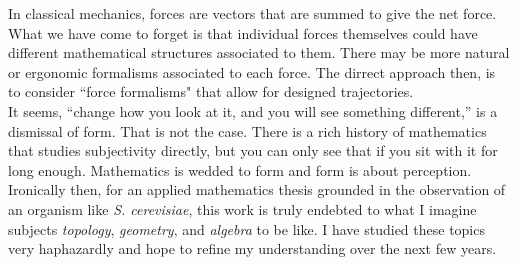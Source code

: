 In classical mechanics, forces are vectors that 
are summed to give the net force. What we have 
come to forget is that individual forces themselves
could have different mathematical structures associated 
to them. There may be more natural or ergonomic 
formalisms associated to each force. 
The dirrect approach then, is to consider 
``force formalisms" that allow for designed trajectories.
\\

It seems, ``change how you look at it, and you will see something 
different,'' is a dismissal of form. That is not the case. 
There is a rich history of mathematics that studies 
subjectivity directly, but you can only see that if you sit with 
it for long enough. Mathematics is wedded to form and form 
is about perception.
\\

Ironically then, for an applied mathematics thesis grounded 
in the observation of an organism like \textit{S. cerevisiae},
this work is truly endebted to what I imagine 
subjects \textit{topology}, \textit{geometry}, and 
\textit{algebra} to be like. I have studied 
these topics very haphazardly and hope to refine my 
understanding over the next few years.
